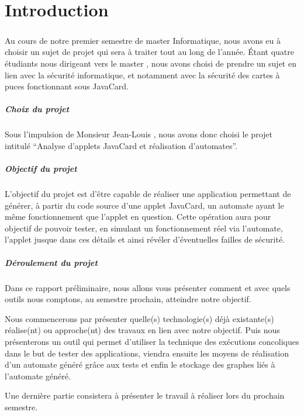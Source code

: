 \setcounter{page}{1}
\chapter*{Introduction}

\paragraph{}
Au cours de notre premier semestre de master Informatique, nous avons eu à choisir un sujet de projet qui sera à traiter tout au long de l'année.
Étant quatre étudiants nous dirigeant vers le master , nous avons choisi de prendre un sujet en lien avec la sécurité informatique, et notamment avec la sécurité des cartes à puces fonctionnant sous JavaCard.

\paragraph{Choix du projet}
Sous l'impulsion de Monsieur Jean-Louis , nous avons donc choisi le projet intitulé ``Analyse d'applets JavaCard et réalisation d'automates''.

\paragraph{Objectif du projet}
L'objectif du projet est d'être capable de réaliser une application permettant de générer, à partir du code source d'une applet JavaCard, un automate ayant le même fonctionnement que l'applet en question. Cette opération aura pour objectif de pouvoir tester, en simulant un fonctionnement réel via l'automate, l'applet jusque dans ces détails et ainsi révéler d'éventuelles failles de sécurité.

\paragraph{Déroulement du projet}
Dans ce rapport préliminaire, nous allons vous présenter comment et avec quels outils nous comptons, au semestre prochain, atteindre notre objectif.

Nous commencerons par présenter quelle(s) technologie(s) déjà existante(s) réalise(nt) ou approche(nt) des travaux en lien avec notre objectif. Puis nous présenterons un outil qui permet d'utiliser la technique des exécutions concoliques dans le but de tester des applications, viendra ensuite les moyens de réalisation d'un automate généré grâce aux tests et enfin le stockage des graphes liés à l'automate généré.

Une dernière partie consistera à présenter le travail à réaliser lors du prochain semestre.